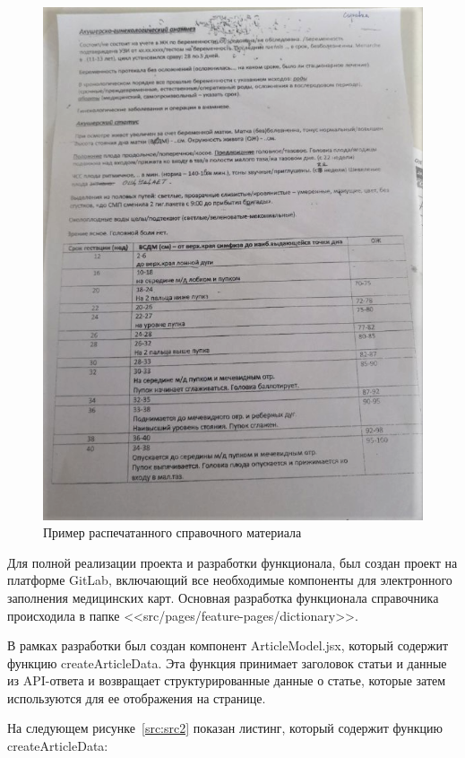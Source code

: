 \begin{figure}
  \includegraphics[scale=0.5]{styles/diploma/inc/ex-ref.png}
  \caption{Пример распечатанного справочного материала}
  \label{fig:ex-ref}
\end{figure}

Для полной реализации проекта и разработки функционала, был создан проект на платформе GitLab, включающий все необходимые компоненты для электронного заполнения медицинских карт. Основная разработка функционала справочника происходила в папке <<src/pages/feature-pages/dictionary>>.

В рамках разработки был создан компонент ArticleModel.jsx, который содержит функцию createArticleData. Эта функция принимает заголовок статьи и данные из API-ответа и возвращает структурированные данные о статье, которые затем используются для ее отображения на странице.

На следующем рисунке~\ref{src:src2} показан листинг, который содержит функцию createArticleData:

